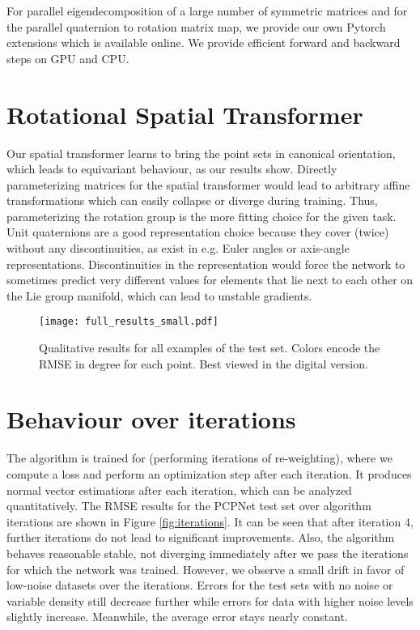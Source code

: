 \documentclass[10pt,twocolumn,letterpaper]{article}
\begin{document}
For parallel eigendecomposition of a large number of symmetric  matrices and for the parallel quaternion to rotation matrix map, we provide our own Pytorch extensions which is available online. We provide efficient forward and backward steps on GPU and CPU.


\section{Rotational Spatial Transformer}
\label{sec:transformer}
Our spatial transformer learns to bring the point sets in canonical orientation, which leads to equivariant behaviour, as our results show. Directly parameterizing  matrices for the spatial transformer would lead to arbitrary affine transformations which
can easily collapse or diverge during training. Thus, parameterizing the rotation group  is the more fitting choice for the given
task. Unit quaternions are a good representation choice because they cover  (twice) without any discontinuities, as exist in e.g. Euler angles or axis-angle representations. Discontinuities in the  representation would
force the network to sometimes predict very different values for  elements that lie next to each other on the
Lie group manifold, which can lead to unstable gradients.





\begin{figure*}[t]
\centering
  \texttt{[image: full\_results\_small.pdf]}
  \caption{Qualitative results for all examples of the test set. Colors encode the RMSE in degree for each point. Best viewed in the digital version.}
  \label{fig:qualitative}
\end{figure*}

\section{Behaviour over iterations}
\label{sec:iterations}
The algorithm is trained for  (performing  iterations of re-weighting), where we compute a loss and perform an optimization step after each iteration. It produces normal vector estimations after each iteration, which can be analyzed quantitatively. The RMSE results for the PCPNet test set over algorithm iterations are shown in Figure \ref{fig:iterations}. It can be seen that after iteration 4, further iterations do not lead to significant improvements. Also, the algorithm behaves reasonable stable, not diverging immediately after we pass the iterations for which the network was trained. However, we observe a small drift in favor of low-noise datasets over the iterations. Errors for the test sets with no noise or variable density still decrease further while errors for data with higher noise levels slightly increase. Meanwhile, the average error stays nearly constant.
\end{document}
